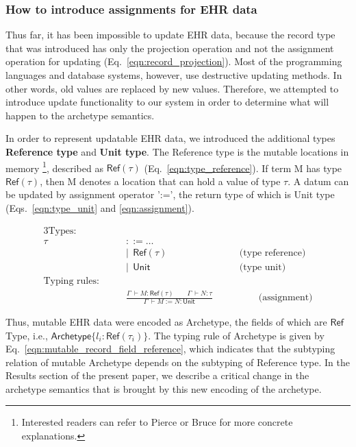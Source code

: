 \documentclass[preprint,3p,onecolumn,times,review]{elsarticle}
\begin{document}
\subsubsection{How to introduce assignments for EHR data \label{sec:howto_introduce_assignments}}

Thus far, it has been impossible to update EHR data, because the record type that was introduced has only the projection operation and not the assignment operation for updating (Eq.~\ref{eqn:record_projection}).
Most of the programming languages and database systems, however, use destructive updating methods. In other words, old values are replaced by new values.
Therefore, we attempted to introduce update functionality to our system in order to determine what will happen to the archetype semantics.

In order to represent updatable EHR data, we introduced the additional types {\bf Reference type} and {\bf Unit type}. 
The Reference type is the mutable locations in memory \footnote{Interested readers can refer to Pierce \cite[p.159]{pierce02:_types_progr_languag} or Bruce \cite[p.77]{bruce02:_found_objec_orien_languag} for more concrete explanations.}, described as $\mathsf{Ref(\tau)}$ (Eq.~\ref{eqn:type_reference}). 
If term M has type $\mathsf{Ref(\tau)}$, then M denotes a location that can hold a value of type $\tau$. 
A datum can be updated by assignment operator ':=', the return type of which is Unit type (Eqs.~\ref{eqn:type_unit} and \ref{eqn:assignment}).


\begin{alignat}{3}
  \text{Types:} \qquad   \nonumber\\
                        \tau~ & {::= \dots }\\
                              & | ~~ \mathsf{Ref(\tau)}                           & \qquad \label{eqn:type_reference} \text{(type reference)}\\
                              & | ~~ \mathsf{Unit}                                & \qquad \label{eqn:type_unit} \text{(type unit)}\\
  \text{Typing rules:} \qquad   \nonumber\\
                              & \frac{\Gamma~ \vdash M:\mathsf{Ref(\tau)} \qquad \Gamma~ \vdash N:\tau}
                                      {\Gamma ~ \vdash M := N:\mathsf{Unit}} & \label{eqn:assignment} \qquad\qquad \text{(assignment)}
\end{alignat}

Thus, mutable EHR data were encoded as Archetype, the fields of which are $\mathsf{Ref}$ Type, i.e., $\mathsf{Archetype}\{l_i : \mathsf{Ref}(\tau_i)\}$. The typing rule of Archetype is given by Eq.~\ref{eqn:mutable_record_field_reference}, which indicates that the subtyping relation of mutable Archetype depends on the subtyping of Reference type. In the Results section of the present paper, we describe a critical change in the archetype semantics that is brought by this new encoding of the archetype.
\end{document}
